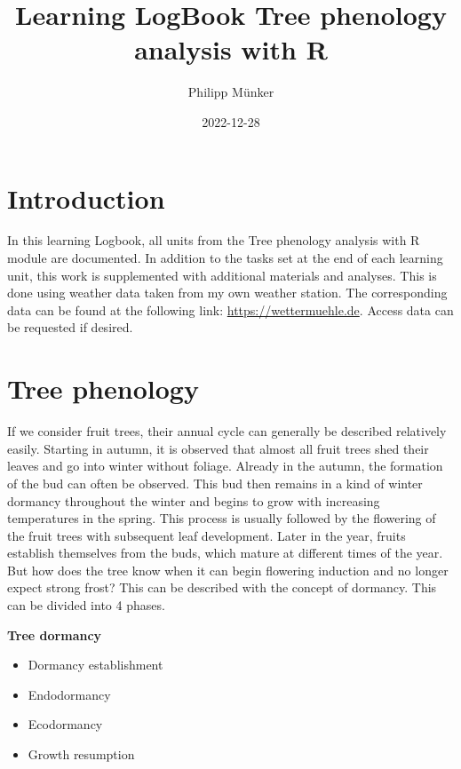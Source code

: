 \documentclass[
]{book}
\title{Learning LogBook Tree phenology analysis with R}
\author{Philipp Münker}
\date{2022-12-28}
\providecommand{\tightlist}{%
  \setlength{\itemsep}{0pt}\setlength{\parskip}{0pt}}
\begin{document}
\maketitle

{
\setcounter{tocdepth}{1}
\tableofcontents
}
\hypertarget{introduction}{%
\chapter{Introduction}\label{introduction}}

In this learning Logbook, all units from the Tree phenology analysis with R module are documented. In addition to the tasks set at the end of each learning unit, this work is supplemented with additional materials and analyses. This is done using weather data taken from my own weather station. The corresponding data can be found at the following link: \url{https://wettermuehle.de}. Access data can be requested if desired.

\hypertarget{tree-phenology}{%
\chapter{Tree phenology}\label{tree-phenology}}

If we consider fruit trees, their annual cycle can generally be described relatively easily. Starting in autumn, it is observed that almost all fruit trees shed their leaves and go into winter without foliage. Already in the autumn, the formation of the bud can often be observed. This bud then remains in a kind of winter dormancy throughout the winter and begins to grow with increasing temperatures in the spring. This process is usually followed by the flowering of the fruit trees with subsequent leaf development. Later in the year, fruits establish themselves from the buds, which mature at different times of the year.
But how does the tree know when it can begin flowering induction and no longer expect strong frost?
This can be described with the concept of dormancy. This can be divided into 4 phases.

\textbf{Tree dormancy}

\begin{itemize}
\tightlist
\item
  Dormancy establishment
\item
  Endodormancy
\item
  Ecodormancy
\item
  Growth resumption
\end{itemize}
\end{document}
